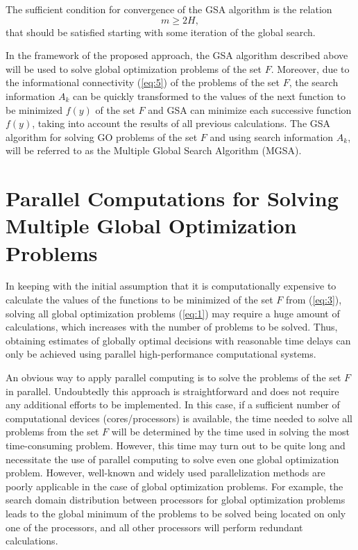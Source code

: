 \documentclass[review]{elsarticle}
\begin{document}
The sufficient condition for convergence of the GSA algorithm is the relation
\begin{equation}\label{eq:24}
m \geq 2H,
\end{equation}
that should be satisfied starting with some iteration of the global search. 

In the framework of the proposed approach, the GSA algorithm described above will be used to solve global optimization problems of the set $F$. Moreover, due to the informational connectivity (\ref{eq:5}) of the problems of the set $F$, the search information $A_k$ can be quickly transformed to the values of the next function to be minimized $f(y)$ of the set $F$ and GSA can minimize each successive function $f(y)$, taking into account the results of all previous calculations. The GSA algorithm for solving GO problems of the set $F$ and using search information $A_k$, will be referred to as the Multiple Global Search Algorithm (MGSA).


\section{Parallel Computations for Solving Multiple Global Optimization Problems}\label{sec:4}

In keeping with the initial assumption that it is computationally expensive to calculate the values of the functions to be minimized of the set $F$ from (\ref{eq:3}), solving all global optimization problems (\ref{eq:1}) may require a huge amount of calculations, which increases with the number of problems to be solved. Thus, obtaining estimates of globally optimal decisions with reasonable time delays can only be achieved using parallel high-performance computational systems. 

An obvious way to apply parallel computing is to solve the problems of the set $F$ in parallel. Undoubtedly this approach is straightforward and does not require any additional efforts to be  implemented. In this case, if a sufficient number of computational devices ({cores/processors}) is available, the time needed to solve all problems from the set $F$ will be determined by the time used in solving the most time-consuming problem. However, this time may turn out to be quite long and necessitate the use of parallel computing to solve even one global optimization problem. However, well-known and widely used parallelization methods are poorly applicable in the case of global optimization problems. For example, the search domain distribution between processors for global optimization problems leads to the global minimum of the problems to be solved being located on only one of the processors, and all other processors will perform redundant calculations.
\end{document}
